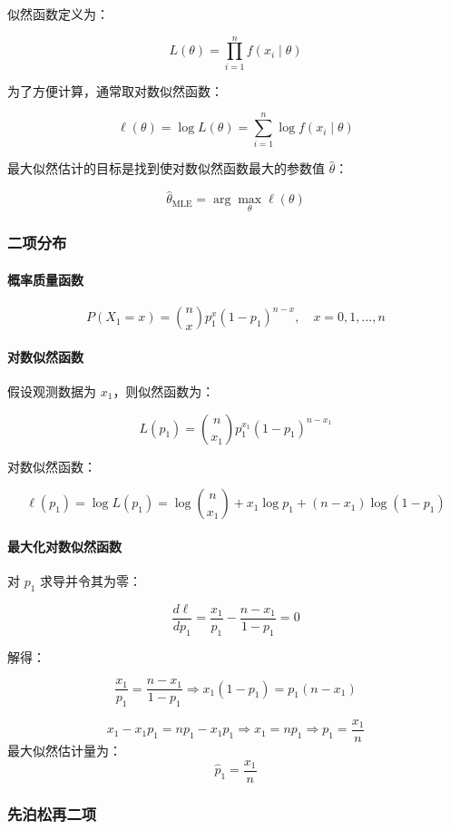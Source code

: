 \documentclass{article}
\begin{document}
似然函数定义为：

$$
L(\theta) = \prod_{i=1}^{n} f(x_i \mid \theta)
$$

为了方便计算，通常取对数似然函数：

$$
\ell(\theta) = \log L(\theta) = \sum_{i=1}^{n} \log f(x_i \mid \theta)
$$

最大似然估计的目标是找到使对数似然函数最大的参数值 $ \hat{\theta} $：

$$
\hat{\theta}_{\text{MLE}} = \arg\max_{\theta} \ell(\theta)
$$


\subsubsection{二项分布}
\paragraph{概率质量函数}
$$
P(X_1 = x) = \binom{n}{x} p_1^x (1 - p_1)^{n - x}, \quad x = 0, 1, \dots, n
$$
\paragraph{对数似然函数}
假设观测数据为 $ x_1 $，则似然函数为：

$$
L(p_1) = \binom{n}{x_1} p_1^{x_1} (1 - p_1)^{n - x_1}
$$

对数似然函数：

$$
\ell(p_1) = \log L(p_1) = \log \binom{n}{x_1} + x_1 \log p_1 + (n - x_1) \log(1 - p_1)
$$

\paragraph{最大化对数似然函数}
对 $ p_1 $ 求导并令其为零：

$$
\frac{d\ell}{dp_1} = \frac{x_1}{p_1} - \frac{n - x_1}{1 - p_1} = 0
$$

解得：

$$
\frac{x_1}{p_1} = \frac{n - x_1}{1 - p_1} \Rightarrow x_1(1 - p_1) = p_1(n - x_1)
$$

$$
x_1 - x_1 p_1 = n p_1 - x_1 p_1 \Rightarrow x_1 = n p_1 \Rightarrow p_1 = \frac{x_1}{n}
$$
最大似然估计量为：
$$
\hat{p}_1 = \frac{x_1}{n}
$$
\subsubsection{先泊松再二项}
\end{document}
